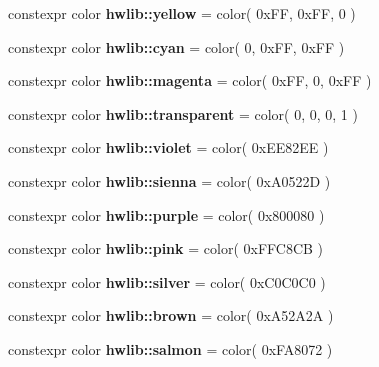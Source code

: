 \begin{DoxyCompactItemize}
\item 
constexpr color {\bfseries hwlib\+::yellow} = color( 0x\+F\+F, 0x\+F\+F, 0 )\hypertarget{namespacehwlib_a5f5e78ccc187ac0649358ce77cb7173f}{}\label{namespacehwlib_a5f5e78ccc187ac0649358ce77cb7173f}

\item 
constexpr color {\bfseries hwlib\+::cyan} = color( 0, 0x\+F\+F, 0x\+F\+F )\hypertarget{namespacehwlib_a2de8bf807b29ec14038fbb448ad4e0e7}{}\label{namespacehwlib_a2de8bf807b29ec14038fbb448ad4e0e7}

\item 
constexpr color {\bfseries hwlib\+::magenta} = color( 0x\+F\+F, 0, 0x\+F\+F )\hypertarget{namespacehwlib_aa4d44b5166927127648eeae921596181}{}\label{namespacehwlib_aa4d44b5166927127648eeae921596181}

\item 
constexpr color {\bfseries hwlib\+::transparent} = color( 0, 0, 0, 1 )\hypertarget{namespacehwlib_a5f2e4acc938c57f1e6030e0656510c21}{}\label{namespacehwlib_a5f2e4acc938c57f1e6030e0656510c21}

\item 
constexpr color {\bfseries hwlib\+::violet} = color( 0x\+E\+E82\+E\+E )\hypertarget{namespacehwlib_a598c038a15212ae56dd81d9708d8a692}{}\label{namespacehwlib_a598c038a15212ae56dd81d9708d8a692}

\item 
constexpr color {\bfseries hwlib\+::sienna} = color( 0x\+A0522\+D )\hypertarget{namespacehwlib_a02e4f7453a14dadbabef58265598fef8}{}\label{namespacehwlib_a02e4f7453a14dadbabef58265598fef8}

\item 
constexpr color {\bfseries hwlib\+::purple} = color( 0x800080 )\hypertarget{namespacehwlib_aba67bcd5e03f50432e45dc75fe432d46}{}\label{namespacehwlib_aba67bcd5e03f50432e45dc75fe432d46}

\item 
constexpr color {\bfseries hwlib\+::pink} = color( 0x\+F\+F\+C8\+C\+B )\hypertarget{namespacehwlib_a2c264d06505f223a3028b1790394849a}{}\label{namespacehwlib_a2c264d06505f223a3028b1790394849a}

\item 
constexpr color {\bfseries hwlib\+::silver} = color( 0x\+C0\+C0\+C0 )\hypertarget{namespacehwlib_a7d764d6d86f662651b76e55da87b5c8f}{}\label{namespacehwlib_a7d764d6d86f662651b76e55da87b5c8f}

\item 
constexpr color {\bfseries hwlib\+::brown} = color( 0x\+A52\+A2\+A )\hypertarget{namespacehwlib_ad3126003784f3b5235989591d8264c0d}{}\label{namespacehwlib_ad3126003784f3b5235989591d8264c0d}

\item 
constexpr color {\bfseries hwlib\+::salmon} = color( 0x\+F\+A8072 )\hypertarget{namespacehwlib_ad15ba22024321378147c49e5dc17cad2}{}\label{namespacehwlib_ad15ba22024321378147c49e5dc17cad2}

\end{DoxyCompactItemize}

